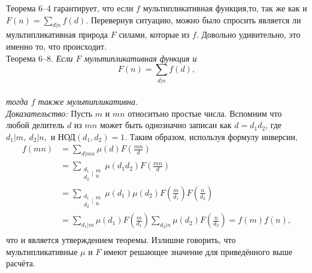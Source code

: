 \documentclass[11pt]{article}
\begin{document}
Теорема 6--4 гарантирует, что если $f$ мультипликативная функция,то, так же как и
$F(n)=\sum_{d|n}f(d)$.
Перевернув ситуацию, можно было спросить является ли мультипликативная природа $F$ силами, которые из $f$. 
Довольно удивительно, это именно то, что происходит.\\[5mm]
{\sc Теорема 6--8.} {\it Если $F$ мультипликативная функция и}\\
$$F(n)=\sum_{d|n}f(d),$$\\
{\it тогда $f$ также мультипликативна.}\\[5mm]
{\itshape Доказательство:}\: Пусть $m$ и $mn$ относитьно простые числа. Вспомним что любой делитель $d$ из $mn$ может быть однозначно записан как $d=d_1d_2$, где $d_1|m,~d_2|n,$ и НОД$(d_1{,} d_2)=1$. Таким образом, используя формулу инверсии,\\
\begin{align*}
f(mn)&=\sum_{d|mn}\mu(d)F\left(\frac{mn}d \right)\\
&=\sum_{\begin{matrix} d_1 \\ d_2 \end{matrix}|\begin{matrix} m \\ n \end{matrix}}\mu(d_1d_2)F\left(\frac{mn}d \right)\\
&=\sum_{\begin{matrix} d_1 \\ d_2 \end{matrix}|\begin{matrix} m \\ n \end{matrix}}
\mu(d_1)\mu(d_2)F\left(\frac m{d_1}\right)F\left(\frac n{d_2}\right)\\
&=\sum_{d_1|m}\mu(d_1)F\left(\frac m{d_1}\right)\sum_{d_2|n}\mu(d_2)F\left( \frac n{d_2}\right)=f(m)f(n),\\
\end{align*}
что и является утверждением теоремы. Излишне говорить, что мультипликативные  $\mu$ и $F$ имеют решающее значение для приведённого выше расчёта.
\end{document}
